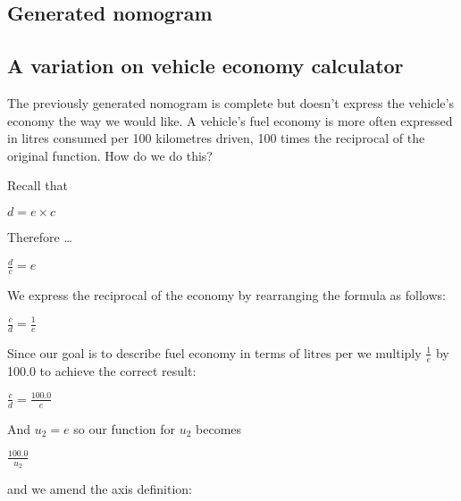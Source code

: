 \documentclass[a4paper,11pt,english]{sphinxmanual}
\begin{document}
\subsection{Generated nomogram}
\label{\detokenize{tutorials/tutorials:generated-nomogram}}
\noindent{}


\subsection{A variation on vehicle economy calculator}
\label{\detokenize{tutorials/tutorials:a-variation-on-vehicle-economy-calculator}}
The previously generated nomogram is complete but doesn’t express the vehicle’s economy the way we would like.  A vehicle’s fuel economy is more often expressed in litres consumed per 100 kilometres driven, 100 times the reciprocal of the original function.  How do we do this?

Recall that

\(d = {e\times c}\)

Therefore …

\({\frac{d}{c}} = e\)

We express the reciprocal of the economy by rearranging the formula as follows:

\(\frac{c}{d} = \frac{1}{e}\)

Since our goal is to describe fuel economy in terms of litres per  we multiply \(\frac{1}{e}\) by 100.0 to achieve the correct result:

\(\frac{c}{d} = \frac{100.0}{e}\)

And \(u_2 = e\) so our function for \(u_2\) becomes

\(\frac{100.0}{u_2}\)

and we amend the axis definition:

\begin{sphinxVerbatim}[commandchars=\\\{\},numbers=left,firstnumber=21,stepnumber=1,formatcom=\scriptsize]
  
     
     
       
     
     
     
     
\end{sphinxVerbatim}
\end{document}
